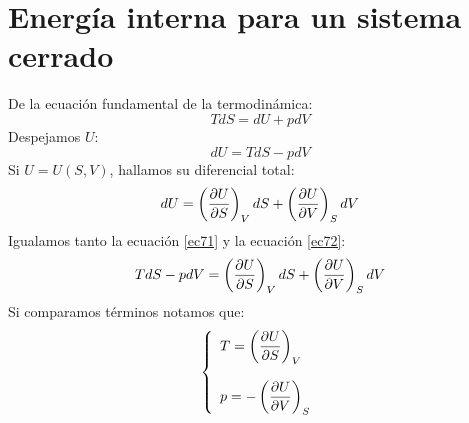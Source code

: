 \documentclass[../main]{subfiles}
\begin{document}
\section{Energía interna para un sistema cerrado}
De la ecuación fundamental de la termodinámica:
\begin{equation}
    TdS=dU+pdV
\end{equation}
Despejamos $U$:
\begin{equation}
    dU=TdS-pdV
    \label{ec71}
\end{equation}
Si $U=U(S,V)$, hallamos su diferencial total:
\begin{equation}
    dU=\left( \pdv{U}{S}\right)_V dS+\left( \pdv{U}{V}\right)_S dV
    \label{ec72}
\end{equation}
Igualamos tanto la ecuación \eqref{ec71} y la ecuación \eqref{ec72}:
\begin{equation}
    TdS-pdV=\left( \pdv{U}{S}\right)_V dS+\left( \pdv{U}{V}\right)_S dV
\end{equation}
Si comparamos términos notamos que:
\begin{equation}
    \left\{ 
    \begin{array}{l}
         T=\left(\displaystyle \pdv{U}{S}\right)_V \\ \\
         p=-\left(\displaystyle \pdv{U}{V}\right)_S
    \end{array} 
    \right. 
\end{equation}
\end{document}
